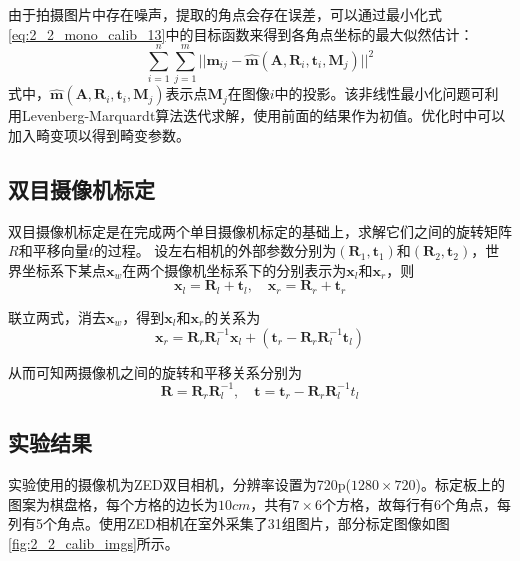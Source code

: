 由于拍摄图片中存在噪声，提取的角点会存在误差，可以通过最小化式\ref{eq:2_2_mono_calib_13}中的目标函数来得到各角点坐标的最大似然估计：
%
\begin{equation}\label{eq:2_2_mono_calib_13}
\sum_{i=1}^{n} \sum_{j=1}^{m}|| \mathbf{m}_{ij} - \hat{\mathbf{m}}(\mathbf{A}, \mathbf{R}_i, \mathbf{t}_i, \mathbf{M}_j) ||^2
\end{equation}
式中，$\hat{\mathbf{m}}(\mathbf{A}, \mathbf{R}_i, \mathbf{t}_i, \mathbf{M}_j)$表示点$\mathbf{M}_j$在图像$i$中的投影。该非线性最小化问题可利用Levenberg-Marquardt算法迭代求解，使用前面的结果作为初值。优化时中可以加入畸变项以得到畸变参数。

\subsection{双目摄像机标定}
双目摄像机标定是在完成两个单目摄像机标定的基础上，求解它们之间的旋转矩阵$R$和平移向量$t$的过程。
设左右相机的外部参数分别为$(\mathbf{R}_1, \mathbf{t}_1)$和$(\mathbf{R}_2, \mathbf{t}_2)$，世界坐标系下某点$\mathbf{x}_w$在两个摄像机坐标系下的分别表示为$\mathbf{x}_l$和$\mathbf{x}_r$，则
%
\begin{equation}\label{eq:2_2_binono_calib_0}
\mathbf{x}_l = \mathbf{R}_l + \mathbf{t}_l, \quad \mathbf{x}_r = \mathbf{R}_r + \mathbf{t}_r
\end{equation}

联立两式，消去$\mathbf{x}_w$，得到$\mathbf{x}_l$和$\mathbf{x}_r$的关系为
%
\begin{equation}\label{eq:2_2_binono_calib_1}
\mathbf{x}_r = \mathbf{R}_r \mathbf{R}_l^{-1}\mathbf{x}_l +
( \mathbf{t}_r - \mathbf{R}_r \mathbf{R}_l^{-1}\mathbf{t}_l )
\end{equation}

从而可知两摄像机之间的旋转和平移关系分别为
%
\begin{equation}\label{eq:2_2_binono_calib_2}
\mathbf{R} = \mathbf{R}_r \mathbf{R}_l^{-1},  \quad
\mathbf{t} =  \mathbf{t}_r -  \mathbf{R}_r  \mathbf{R}_l^{-1} t_l
\end{equation}

\subsection{实验结果}
实验使用的摄像机为ZED双目相机，分辨率设置为720p($1280\times 720$)。标定板上的图案为棋盘格，每个方格的边长为$10cm$，共有$7 \times 6$个方格，故每行有6个角点，每列有5个角点。使用ZED相机在室外采集了31组图片，部分标定图像如图\ref{fig:2_2_calib_imgs}所示。

